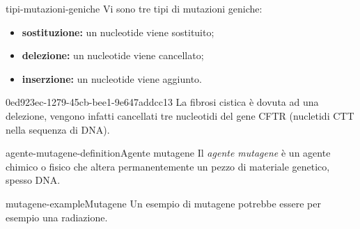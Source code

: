 \documentclass[preview]{standalone}
\begin{document}
\begin{snippet}{tipi-mutazioni-geniche}
    Vi sono tre tipi di mutazioni geniche:
    \begin{itemize}
        \item \textbf{sostituzione:} un nucleotide viene sostituito;
        \item \textbf{delezione:} un nucleotide viene cancellato;
        \item \textbf{inserzione:} un nucleotide viene aggiunto.
    \end{itemize}
\end{snippet}

\begin{snippet}{0ed923ec-1279-45cb-bee1-9e647addcc13}
    La fibrosi cistica è dovuta ad una delezione, vengono infatti cancellati tre nucleotidi
    del gene CFTR (nucletidi CTT nella sequenza di DNA).
\end{snippet}

\begin{snippetdefinition}{agente-mutagene-definition}{Agente mutagene}
    Il \textit{agente mutagene} è un agente chimico o fisico che altera permanentemente
    un pezzo di materiale genetico, spesso DNA.
\end{snippetdefinition}


\begin{snippetexample}{mutagene-example}{Mutagene}
    Un esempio di mutagene potrebbe essere per esempio una radiazione.
\end{snippetexample}
\end{document}
